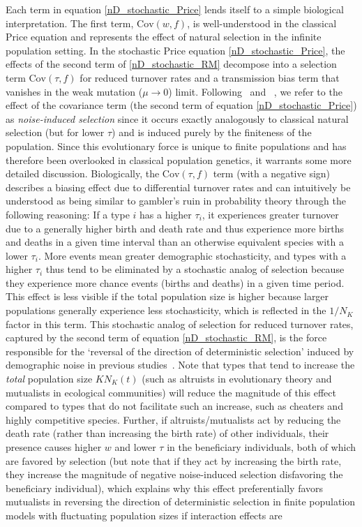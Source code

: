 Each term in equation \eqref{nD_stochastic_Price} lends itself to a simple biological interpretation. The first term, $\textrm{Cov}(w,f)$, is well-understood in the classical Price equation and represents the effect of natural selection in the infinite population setting. In the stochastic Price equation \eqref{nD_stochastic_Price}, the effects of the second term of 
\eqref{nD_stochastic_RM} decompose into a selection term $\textrm{Cov}(\tau,f)$ for reduced turnover rates and a transmission bias term that vanishes in the weak mutation ($\mu \to 0$) limit. Following~\cite{constable_demographic_2016} and ~\cite{week_white_2021}, we refer to the effect of the covariance term (the second term of equation \eqref{nD_stochastic_Price}) as \emph{noise-induced selection} since it occurs exactly analogously to classical natural selection (but for lower $\tau$) and is induced purely by the finiteness of the population. Since this evolutionary force is unique to finite populations and has therefore been overlooked in classical population genetics, it warrants some more detailed discussion. Biologically, the $\textrm{Cov}(\tau,f)$ term (with a negative sign) describes a biasing effect due to differential turnover rates and can intuitively be understood as being similar to gambler's ruin in probability theory through the following reasoning: If a type $i$ has a higher $\tau_i$, it experiences greater turnover due to a generally higher birth and death rate and thus experience more births and deaths in a given time interval than an otherwise equivalent species with a lower $\tau_i$. More events mean greater demographic stochasticity, and types with a higher $\tau_i$ thus tend to be eliminated by a stochastic analog of selection because they experience more chance events (births and deaths) in a given time period. This effect is less visible if the total population size is higher because larger populations generally experience less stochasticity, which is reflected in the $1/N_K$ factor in this term. This stochastic analog of selection for reduced turnover rates, captured by the second term of equation \eqref{nD_stochastic_RM}, is the force responsible for the `reversal of the direction of deterministic selection' induced by demographic noise in previous studies~\citep{houchmandzadeh_selection_2012, houchmandzadeh_fluctuation_2015, constable_demographic_2016, mcleod_social_2019}. Note that types that tend to increase the \emph{total} population size $KN_K(t)$ (such as altruists in evolutionary theory and mutualists in ecological communities) will reduce the magnitude of this effect compared to types that do not facilitate such an increase, such as cheaters and highly competitive species. Further, if altruists/mutualists act by reducing the death rate (rather than increasing the birth rate) of other individuals, their presence causes higher $w$ and lower $\tau$ in the beneficiary individuals, both of which are favored by selection (but note that if they act by increasing the birth rate, they increase the magnitude of negative noise-induced selection disfavoring the beneficiary individual), which explains why this effect preferentially favors mutualists in reversing the direction of deterministic selection in finite population models with fluctuating population sizes if interaction effects are 